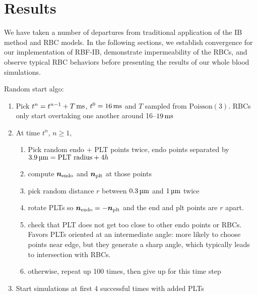 \section{Results}\label{sec:results}

We have taken a number of departures from traditional application of the IB method and
RBC models. In the following sections, we establish convergence for our implementation
of RBF-IB, demonstrate impermeability of the RBCs, and observe typical RBC behaviors
before presenting the results of our whole blood simulations.







Random start algo:
\begin{enumerate}
    \item Pick $t^n = t^{n-1} + T\ms$, $t^0 = 16\ms$ and $T$ sampled from $\text{Poisson}(3)$. RBCs only start overtaking one another around 16--$19\ms$
    \item At time $t^n$, $n \ge 1$,
        \begin{enumerate}
            \item Pick random endo + PLT points twice, endo points separated by $3.9\um = \text{PLT radius} + 4h$
            \item compute $\boldsymbol{n}_\text{endo}$ and $\boldsymbol{n}_\text{plt}$ at those points
            \item pick random distance $r$ between $0.3\um$ and $1\um$ twice
            \item rotate PLTs so $\boldsymbol{n}_\text{endo} = -\boldsymbol{n}_\text{plt}$ and the end and plt points are $r$ apart. 
            \item check that PLT does not get too close to other endo points or RBCs.
                Favors PLTs oriented at an intermediate angle: more likely to choose points near edge, but they generate a sharp angle, which typically leads to intersection with RBCs.
            \item otherwise, repeat up 100 times, then give up for this time step
        \end{enumerate}
    \item Start simulations at first 4 successful times with added PLTs
\end{enumerate}
